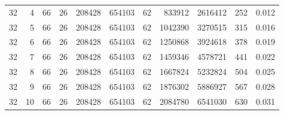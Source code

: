 \begin{table}[t]
\begin{tabularx}{\linewidth}{rrrrrrrrrrr}
32 & 4 & 66 & 26 & 208428 & 654103 & 62 & 833912 & 2616412 & 252 & 0.012 \\
32 & 5 & 66 & 26 & 208428 & 654103 & 62 & 1042390 & 3270515 & 315 & 0.016 \\
32 & 6 & 66 & 26 & 208428 & 654103 & 62 & 1250868 & 3924618 & 378 & 0.019 \\
32 & 7 & 66 & 26 & 208428 & 654103 & 62 & 1459346 & 4578721 & 441 & 0.022 \\
32 & 8 & 66 & 26 & 208428 & 654103 & 62 & 1667824 & 5232824 & 504 & 0.025 \\
32 & 9 & 66 & 26 & 208428 & 654103 & 62 & 1876302 & 5886927 & 567 & 0.028 \\
32 & 10 & 66 & 26 & 208428 & 654103 & 62 & 2084780 & 6541030 & 630 & 0.031 \\
\bottomrule
\end{tabularx}
\end{table}
